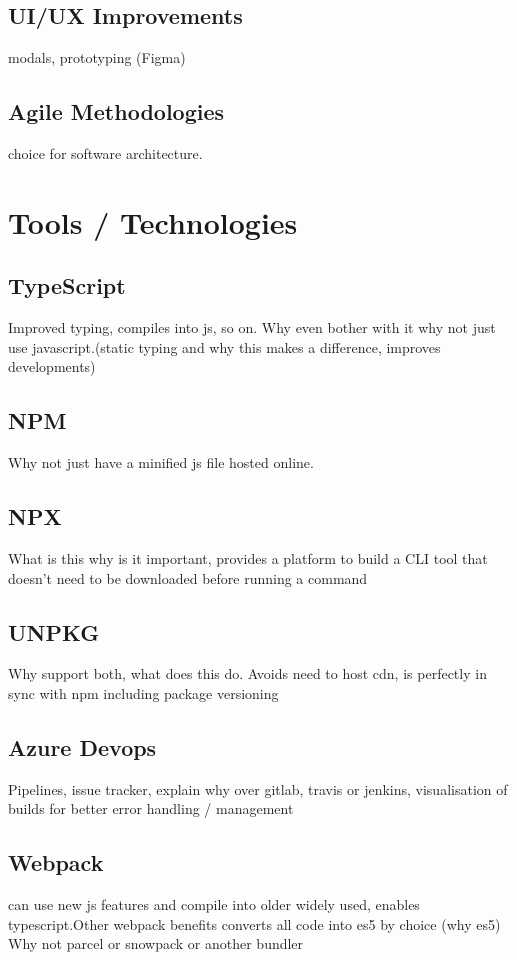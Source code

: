 \documentclass{l4proj}
\begin{document}
\section{UI/UX Improvements}
\text modals, prototyping (Figma)
\section{Agile Methodologies}
\text choice for software architecture.
\chapter{Tools / Technologies}

\section{TypeScript}
\text Improved typing, compiles into js, so on. Why even bother with it why not just use javascript.(static typing and why this makes a difference, improves developments)
\section{NPM}
\text Why not just have a minified js file hosted online.
\section{NPX}
\text What is this why is it important, provides a platform to build a CLI tool that doesn’t need to be downloaded before running a command
\section{UNPKG}
\text Why support both, what does this do. Avoids need to host cdn, is perfectly in sync with npm including package versioning
\section{Azure Devops}
\text Pipelines, issue tracker, explain why over gitlab, travis or jenkins, visualisation of builds for better error handling / management
\section{Webpack}
\text can use new js features and compile into older widely used, enables typescript.Other webpack benefits converts all code into es5 by choice (why es5)
Why not parcel or snowpack or another bundler
\end{document}
